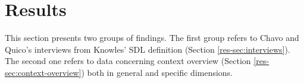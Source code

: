 \chapter{Results}
\label{chap:results}

This section presents two groups of findings. The first group refers to Chavo and Quico’s interviews from Knowles’ \gls{SDL} definition (Section \ref{res-sec:interviews}). The second one refers to data concerning context overview (Section \ref{res-sec:context-overview}) both in general and specific dimensions.